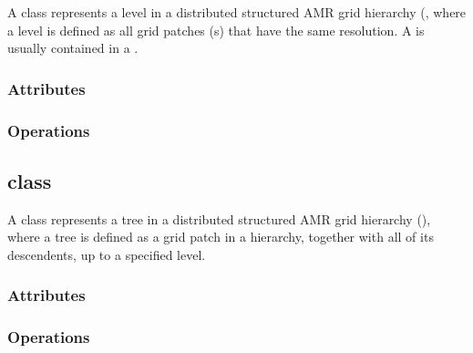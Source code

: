 \documentclass{article}
\begin{document}
A  class represents a level in a distributed structured
AMR grid hierarchy (, where a level is defined as all
grid patches (s) that have the same resolution.  A 
is usually contained in a .


\subsubsection{Attributes}

\subsubsection{Operations}

\subsection{ class}

A  class represents a tree in a distributed structured AMR
grid hierarchy (), where a tree is defined as a grid patch
in a hierarchy, together with all of its descendents, up to a specified
level.


\subsubsection{Attributes}

\subsubsection{Operations}
\end{document}
